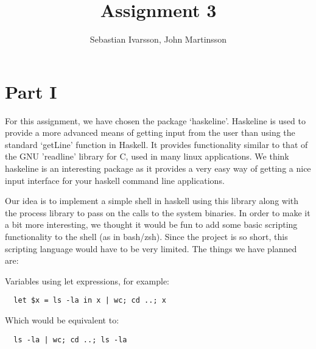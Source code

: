 \documentclass[11pt,a4paper]{article}
\begin{document}
\pagestyle{fancy}

\renewcommand{\headrulewidth}{0pt} \setlength{\headsep}{30pt}
\setlength{\headheight}{30pt}

\title{Assignment 3}
\author{Sebastian Ivarsson, John Martinsson}
\maketitle
\thispagestyle{fancy}


\section{Part I}
For this assignment, we have chosen the package ‘haskeline’. Haskeline is used
to provide a more advanced means of getting input from the user than using the
standard ‘getLine’ function in Haskell. It provides functionality similar to
that of the GNU 'readline' library for C, used in many linux applications. We
think haskeline is an interesting package as it provides a very easy way of
getting a nice input interface for your haskell command line applications.

Our idea is to implement a simple shell in haskell using this library along with
the process library to pass on the calls to the system binaries. In order to
make it a bit more interesting, we thought it would be fun to add some basic
scripting functionality to the shell (as in bash/zsh). Since the project is so
short, this scripting language would have to be very limited. The things we have
planned are:

Variables using let expressions, for example:
\begin{verbatim}
  let $x = ls -la in x | wc; cd ..; x
\end{verbatim}

Which would be equivalent to:

\begin{verbatim}
  ls -la | wc; cd ..; ls -la
\end{verbatim}
\end{document}
